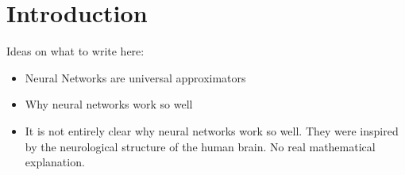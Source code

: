 \section{Introduction}

Ideas on what to write here:
\begin{itemize}
	\item Neural Networks are universal approximators
	\item Why neural networks work so well \cite{lin17}
	\item It is not entirely clear why neural networks work so well. 
	They were inspired by the neurological structure of the human brain.
	No real mathematical explanation.
\end{itemize}